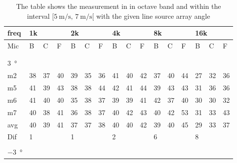 \begin{table}[H]
\centering
\caption{The table shows the measurement in in octave band and within the interval $[\SI{5}{\meter\per\second},\, \SI{7}{\meter\per\second}[ $ with the given line source array angle}
\begin{tabular}{l|l|l|l|l|l|l|l|l|l|l|l|l|lll}
freq & \multicolumn{3}{l|}{1k} & \multicolumn{3}{l|}{2k} & \multicolumn{3}{l|}{4k} & \multicolumn{3}{l|}{8k} & \multicolumn{3}{l}{16k}                                \\ \hline
Mic  & B      & C      & F     & B      & C      & F     & B      & C      & F     & B      & C      & F     & \multicolumn{1}{l|}{B}  & \multicolumn{1}{l|}{C}  & F  \\ \hline
 & \multicolumn{3}{l|}{} & \multicolumn{3}{l|}{} & \multicolumn{3}{l|}{} & \multicolumn{3}{l|}{} & \multicolumn{3}{l}{}                                \\ 
 \multicolumn{16}{l}{ } \\   
\SI{3}{\degree}   & \multicolumn{3}{l|}{} & \multicolumn{3}{l|}{} & \multicolumn{3}{l|}{} & \multicolumn{3}{l|}{} & \multicolumn{3}{l}{}   \\  \hline
m2    &  38    &  37    &  40    &  39    &   35   &  36    &  41    &   40    &   42   &   37    &   40   &   44   & \multicolumn{1}{l|}{27} & \multicolumn{1}{l|}{32} & 36 \\
m5    &  41    &  39    &   43   &   38   &  38    &  44    &   42   &   41    &  44    &   39    &   43   &  43    & \multicolumn{1}{l|}{31} & \multicolumn{1}{l|}{36} & 36 \\
m6    &  41    & 40     &  40    &   35   &  38    &   37   &   39   &    39   &  41    &    42   &    37  &   40   & \multicolumn{1}{l|}{30} & \multicolumn{1}{l|}{30} &  32\\
m7    &  40    &  38    &  41    &  36    &  38    &   37   &    40  &   42    &   43   &    40   &  42    &    53  & \multicolumn{1}{l|}{31} & \multicolumn{1}{l|}{33} & 43 \\ \hline
avg   &  40    &  39    &  41    &  37    & 37     &  38    &  40    &  40     &  42    &   39    &  40    & 45     & \multicolumn{1}{l|}{29} & \multicolumn{1}{l|}{33}  & 37  \\ \hline  
Dif & \multicolumn{3}{l|}{1} & \multicolumn{3}{l|}{1} & \multicolumn{3}{l|}{2} & \multicolumn{3}{l|}{6} & \multicolumn{3}{l}{8}  \\ 
\multicolumn{16}{l}{ } \\        
\SI{-3}{\degree}   & \multicolumn{3}{l|}{} & \multicolumn{3}{l|}{} & \multicolumn{3}{l|}{} & \multicolumn{3}{l|}{} & \multicolumn{3}{l}{}   \\  \hline

\end{tabular}
\end{table}
